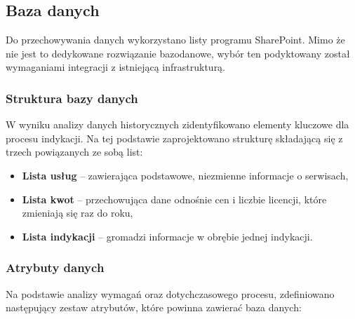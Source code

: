 \subsection{Baza danych}

Do przechowywania danych wykorzystano listy programu SharePoint. Mimo że nie jest to dedykowane rozwiązanie bazodanowe, wybór ten podyktowany został wymaganiami integracji z istniejącą infrastrukturą.

\subsubsection{Struktura bazy danych}
W wyniku analizy danych historycznych zidentyfikowano elementy kluczowe dla procesu indykacji. Na tej podstawie zaprojektowano strukturę składającą się z trzech powiązanych ze sobą list:

\begin{itemize}
    \item \textbf{Lista usług} -- zawierająca podstawowe, niezmienne informacje o serwisach,
    \item \textbf{Lista kwot} -- przechowująca dane odnośnie cen i liczbie licencji, które zmieniają się raz do roku,
    \item \textbf{Lista indykacji} -- gromadzi informacje w obrębie jednej indykacji.
\end{itemize}
\subsubsection{Atrybuty danych}
Na podstawie analizy wymagań oraz dotychczasowego procesu, zdefiniowano następujący zestaw atrybutów, które powinna zawierać baza danych:

